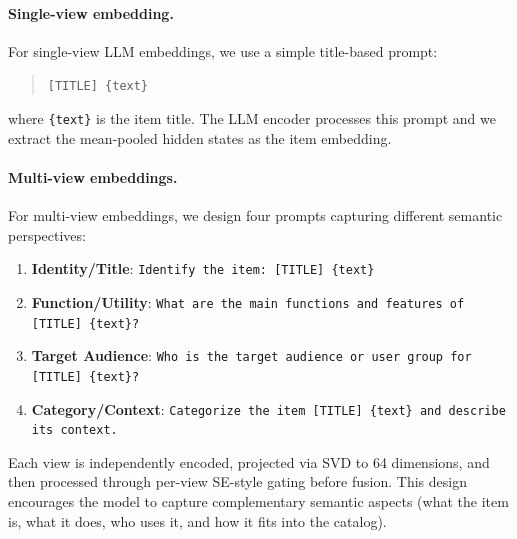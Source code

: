 \paragraph{Single-view embedding.}
For single-view LLM embeddings, we use a simple title-based
prompt:
\begin{quote}
\texttt{[TITLE] \{text\}}
\end{quote}
where \texttt{\{text\}} is the item title. The LLM encoder
processes this prompt and we extract the mean-pooled hidden
states as the item embedding.

\paragraph{Multi-view embeddings.}
For multi-view embeddings, we design four prompts capturing
different semantic perspectives:
\begin{enumerate}[leftmargin=*,itemsep=1pt]
  \item \textbf{Identity/Title}:
    \texttt{Identify the item: [TITLE] \{text\}}
  \item \textbf{Function/Utility}:
    \texttt{What are the main functions and features of
    [TITLE] \{text\}?}
  \item \textbf{Target Audience}:
    \texttt{Who is the target audience or user group for
    [TITLE] \{text\}?}
  \item \textbf{Category/Context}:
    \texttt{Categorize the item [TITLE] \{text\} and describe
    its context.}
\end{enumerate}
Each view is independently encoded, projected via SVD to 64
dimensions, and then processed through per-view SE-style gating
before fusion.
This design encourages the model to capture complementary
semantic aspects (what the item is, what it does, who uses
it, and how it fits into the catalog).
